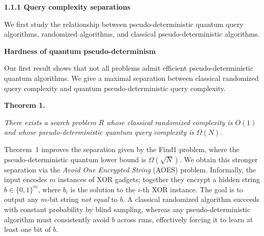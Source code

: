 \documentclass[10pt,a4paper]{article}
\begin{document}
\par\medskip\noindent\textbf{
1.1.1 Query complexity separations}\par




We first study the relationship between pseudo-deterministic quantum query algorithms, randomized algorithms, and classical pseudo-deterministic algorithms.\par




\par\medskip\noindent\textbf{Hardness of quantum pseudo-determinism}\par




Our first result shows that not all problems admit efficient pseudo-deterministic quantum algorithms. We give a maximal separation between classical randomized query complexity and quantum pseudo-deterministic query complexity.\par





\par\medskip\noindent\textbf{
\textbf{Theorem 1}\textbf{.}
}\par



\emph{There exists a search problem ${R}$ whose classical randomized complexity is $O(1)$ and whose pseudo-deterministic quantum query complexity is $\Omega(N)$.}\par






Theorem 1 improves the separation given by the Find1 problem, where the pseudo-deterministic quantum lower bound is $\Omega(\sqrt{N})$.
We obtain this stronger separation via the \emph{Avoid One Encrypted String} (AOES) problem. Informally, the input encodes $m$ instances of XOR gadgets; together they encrypt a hidden string $b\in\{0,1\}^{m}$, where $b_{i}$ is the solution to the $i$-th XOR instance. The goal is to output any $m$-bit string \emph{not equal} to $b$. A classical randomized algorithm succeeds with constant probability by blind sampling, whereas any pseudo-deterministic algorithm must consistently avoid $b$ across runs, effectively forcing it to learn at least one bit of $b$.\par
\end{document}
